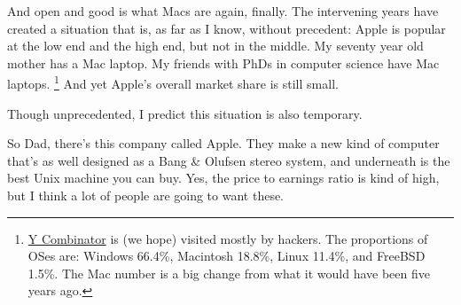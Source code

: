 And open and good is what Macs are again, finally. The intervening years
have created a situation that is, as far as I know, without precedent:
Apple is popular at the low end and the high end, but not in the middle.
My seventy year old mother has a Mac laptop. My friends with PhDs in
computer science have Mac laptops. \footnote{\href{http://ycombinator.com}{Y Combinator} is (we hope) visited
mostly by hackers. The proportions of OSes are: Windows 66.4\%,
Macintosh 18.8\%, Linux 11.4\%, and FreeBSD 1.5\%. The Mac number is a
big change from what it would have been five years ago.} And yet Apple's overall
market share is still small.

Though unprecedented, I predict this situation is also temporary.

So Dad, there's this company called Apple. They make a new kind of
computer that's as well designed as a Bang \& Olufsen stereo system, and
underneath is the best Unix machine you can buy. Yes, the price to
earnings ratio is kind of high, but I think a lot of people are going to
want these.